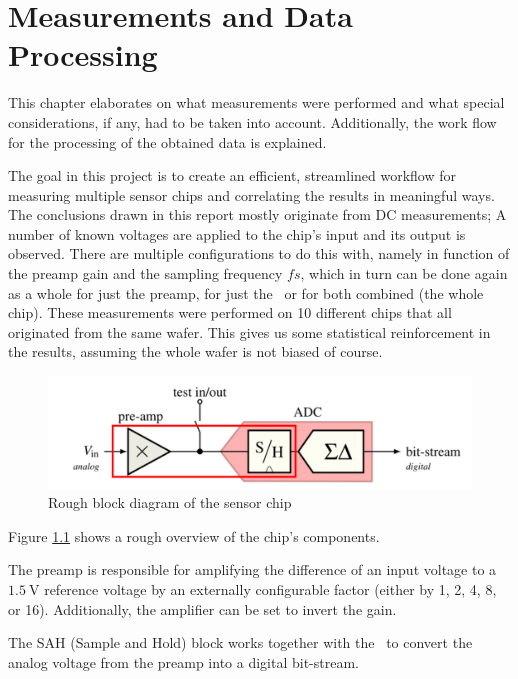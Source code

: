 \chapter{Measurements and Data Processing}
\label{chap:measurements}


This chapter elaborates  on what measurements were performed  and what special
considerations, if any,  had to be taken into  account. Additionally, the work
flow for the processing of the obtained data is explained.

The goal in this project is  to create an efficient, streamlined workflow for
measuring  multiple sensor  chips and  correlating the  results in  meaningful
ways.   The  conclusions  drawn  in  this report  mostly  originate  from  DC
measurements; A number  of known voltages are applied to  the chip's input and
its output  is observed. There  are multiple configurations  to do  this with,
namely in function  of the preamp gain and the  sampling frequency $fs$, which
in turn can be done again as a whole for just the preamp, for just the \sdm~or
for both  combined (the whole  chip). These measurements were performed  on 10
different chips that  all originated from the same wafer.   This gives us some
statistical  reinforcement in  the results,  assuming the  whole wafer  is not
biased of course.

\begin{figure}[t]
    \centering
    \includegraphics[width=.8\linewidth]{images/blockdiagram.png}
    \caption{Rough block diagram of the sensor chip}
    \label{fig:blockdiagram}
\end{figure}

Figure \ref{fig:blockdiagram} shows a rough overview of the chip's components.

The preamp is responsible for amplifying the difference of an input voltage to
a  $\SI{1.5}{\volt}$ reference voltage by an  externally  configurable  factor
(either  by  1,  2,  4,  8,  or 16). Additionally, the amplifier can be set to
invert the gain.

The SAH  (Sample and Hold) block  works together with the  \sdm~to convert the
analog voltage from the preamp into a digital bit-stream.

